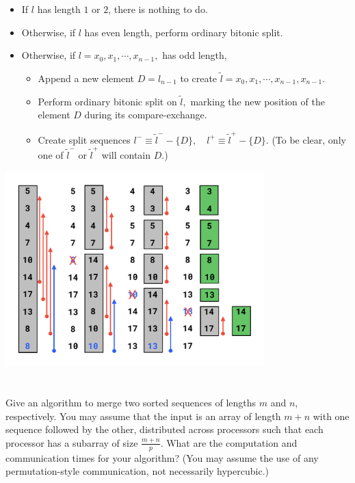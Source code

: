 \documentclass{article}
\begin{document}
\begin{itemize}
  \item If $l$ has length $1$ or $2$, there is nothing to do.
  \item Otherwise, if $l$ has even length, perform ordinary bitonic split.
  \item Otherwise, if $l = x_0, x_1, \cdots, x_{n-1},$ has odd length, 
  \begin{itemize}
    \item Append a new element $D = l_{n-1}$ to create $\tilde{l} =x_0, x_1, \cdots, x_{n-1}, x_{n-1}.$
    \item Perform ordinary bitonic split on $\tilde{l},$ marking the new position of the element $D$ during its compare-exchange.
    \item Create split sequences $l^{-} \equiv \tilde{l}^{-} - \{D\},\quad l^{+} \equiv \tilde{l}^{+} - \{D\}.$
    (To be clear, only one of $\tilde{l}^{-}$ or $\tilde{l}^{+}$ will contain $D$.)
  \end{itemize}
\end{itemize}

\begin{center}
  \includegraphics[width=100mm]{odd_length_bitonic_sort.pdf}
\end{center}

\section{}
Give an algorithm to merge two sorted sequences of lengths $m$ and $n$, respectively.
You may assume that the input is an array of length $m+n$ with one sequence followed by the other, distributed across processors such that each processor has a subarray of size $\frac{m+n}{p}$.
What are the computation and communication times for your algorithm?
(You may assume the use of any permutation-style communication, not necessarily hypercubic.)
\end{document}
